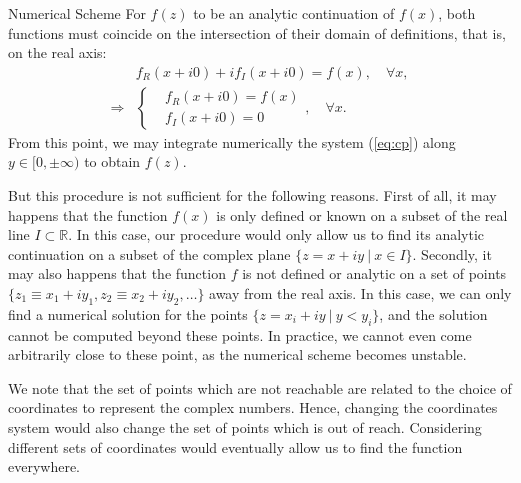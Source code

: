 \begin{section}{Numerical Scheme}
  For $f(z)$ to be an analytic continuation of $f(x)$, both functions
  must coincide on the intersection of their domain of definitions,
  that is, on the real axis:
  \begin{align}
    &f_R(x+i0)+if_I(x+i0) = f(x),\quad \forall x,\\
    \Rightarrow
    &\left\{
    \begin{aligned}
      &f_R(x+i0) = f(x)\\
      &f_I(x+i0) = 0
    \end{aligned}
    \right.,\quad \forall x.
  \end{align}
  From this point, we may integrate numerically the system
  (\ref{eq:cp}) along $y\in [0,\pm\infty)$ to obtain $f(z)$.

  But this procedure is not sufficient for the following
  reasons. First of all, it may happens that the function $f(x)$ is
  only defined or known on a subset of the real line $I\subset
  \mathbb{R}$. In this case, our procedure would only allow us to find
  its analytic continuation on a subset of the complex plane
  $\{z=x+iy\ |\ x\in I\}$. Secondly, it may also happens that the
  function $f$ is not defined or analytic on a set of points $\{z_1
  \equiv x_1+iy_1, z_2 \equiv x_2+iy_2, \dots\}$ away from the real
  axis. In this case, we can only find a numerical solution for the
  points $\{z=x_i+iy\ |\ y<y_i\}$, and the solution cannot be computed
  beyond these points.
  In practice, we cannot even come arbitrarily close to these
  point, as the numerical scheme becomes unstable.

  We note that the set of points which are not reachable are related
  to the choice of coordinates to represent the complex
  numbers. Hence, changing the coordinates system would also change
  the set of points which is out of reach. Considering different sets
  of coordinates would eventually allow us to find the function
  everywhere.


\end{section}
